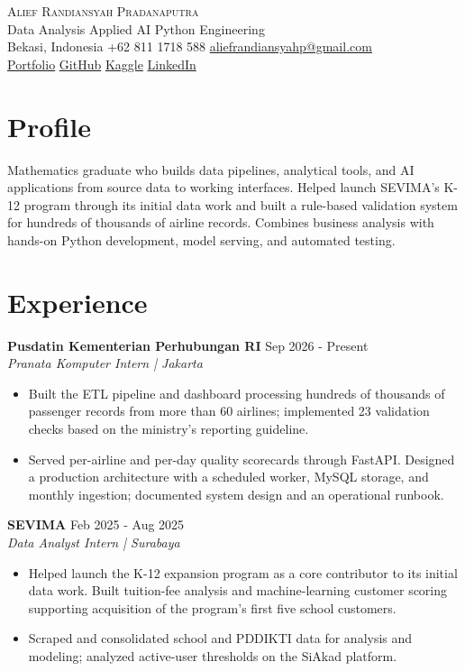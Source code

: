 \documentclass[11pt,a4paper]{article}
\begin{document}
\begin{center}
{\LARGE\scshape Alief Randiansyah Pradanaputra}\\[4pt]
Data Analysis \textbar{} Applied AI \textbar{} Python Engineering\\[4pt]
\small Bekasi, Indonesia \textbar{} +62 811 1718 588 \textbar{} \href{mailto:aliefrandiansyahp@gmail.com}{aliefrandiansyahp@gmail.com}\\[2pt]
\href{https://akarandy.github.io/}{Portfolio} \textbar{} \href{https://github.com/AKARandy}{GitHub} \textbar{} \href{https://www.kaggle.com/aliefrandiansyah}{Kaggle} \textbar{} \href{https://www.linkedin.com/in/alief-randiansyah}{LinkedIn}
\end{center}
\small
\section{Profile}
Mathematics graduate who builds data pipelines, analytical tools, and AI applications from source data to working interfaces. Helped launch SEVIMA's K-12 program through its initial data work and built a rule-based validation system for hundreds of thousands of airline records. Combines business analysis with hands-on Python development, model serving, and automated testing.
\section{Experience}
\textbf{Pusdatin Kementerian Perhubungan RI} \hfill Sep 2026 - Present\\
\textit{Pranata Komputer Intern | Jakarta}\par
\begin{itemize}
\item Built the ETL pipeline and dashboard processing hundreds of thousands of passenger records from more than 60 airlines; implemented 23 validation checks based on the ministry's reporting guideline.
\item Served per-airline and per-day quality scorecards through FastAPI. Designed a production architecture with a scheduled worker, MySQL storage, and monthly ingestion; documented system design and an operational runbook.
\end{itemize}
\textbf{SEVIMA} \hfill Feb 2025 - Aug 2025\\
\textit{Data Analyst Intern | Surabaya}\par
\begin{itemize}
\item Helped launch the K-12 expansion program as a core contributor to its initial data work. Built tuition-fee analysis and machine-learning customer scoring supporting acquisition of the program's first five school customers.
\item Scraped and consolidated school and PDDIKTI data for analysis and modeling; analyzed active-user thresholds on the SiAkad platform.
\end{itemize}
\end{document}
